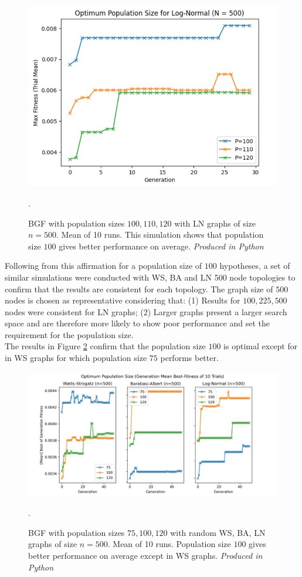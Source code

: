 \documentclass[
	a4paper, %
	10pt, %
	unnumberedsections, %
	twoside, %
]{LTJournalArticle}
\begin{document}
\begin{figure}[H]
	\includegraphics[width=\linewidth]{Figures/sims/population/ln_500.jpg}
	\caption{BGF with population sizes \(100, 110, 120\) with LN graphs of size \(n = 500\). Mean of 10 runs. This simulation shows that population size \(100\) gives better performance on average. \emph{Produced in Python}}. 
	\label{fig:ln_500}
\end{figure}

Following from this affirmation for a population size of \(100\) hypotheses, a set of similar simulations were conducted with WS, BA and LN 500 node topologies to confirm that the results are consistent for each topology. The graph size of \(500\) nodes is chosen as representative considering that: (1) Results for \(100, 225, 500\) nodes were consistent for LN graphs; (2) Larger graphs present a larger search space and are therefore more likely to show poor performance and set the requirement for the population size.\\

The results in Figure \ref{fig:all_pop} confirm that the population size \(100\) is optimal except for in WS graphs for which population size \(75\) performs better.\\

\begin{figure}
	\includegraphics[width=\linewidth]{Figures/sims/population/all_pop.jpg}
	\caption{BGF with population sizes \(75, 100, 120\) with random WS, BA, LN graphs of size \(n = 500\). Mean of 10 runs. Population size \(100\) gives better performance on average except in WS graphs. \emph{Produced in Python}}. 
	\label{fig:all_pop}
\end{figure}
\end{document}

